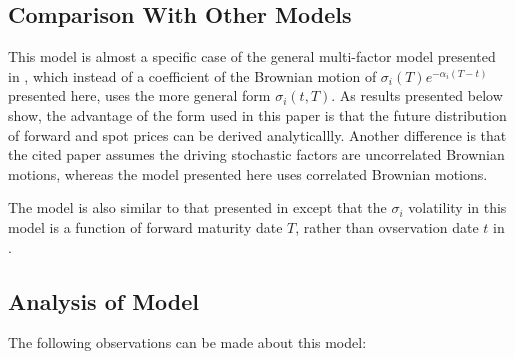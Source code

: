 \documentclass{article}
\begin{document}
\subsection{Comparison With Other Models}

This model is almost a specific case of the general multi-factor model presented
in \cite{Clewlow}, which instead of a coefficient of the Brownian motion of
$\sigma_i(T)e^{-\alpha_i(T-t)}$ presented here, uses the more general form
$\sigma_i(t, T)$. As results presented below show, the advantage of the form
used in this paper is that the future distribution of forward and spot prices
can be derived analyticallly. Another difference is that the cited paper assumes the driving stochastic factors
are uncorrelated Brownian motions, whereas the model presented here uses correlated
Brownian motions.

\bigskip

The model is also similar to that presented in \cite{Warin} except that the $\sigma_i$
volatility in this model is a function of forward maturity date $T$, rather than
ovservation date $t$ in \cite{Warin}.

\subsection{Analysis of Model}
The following observations can be made about this model:
\end{document}
